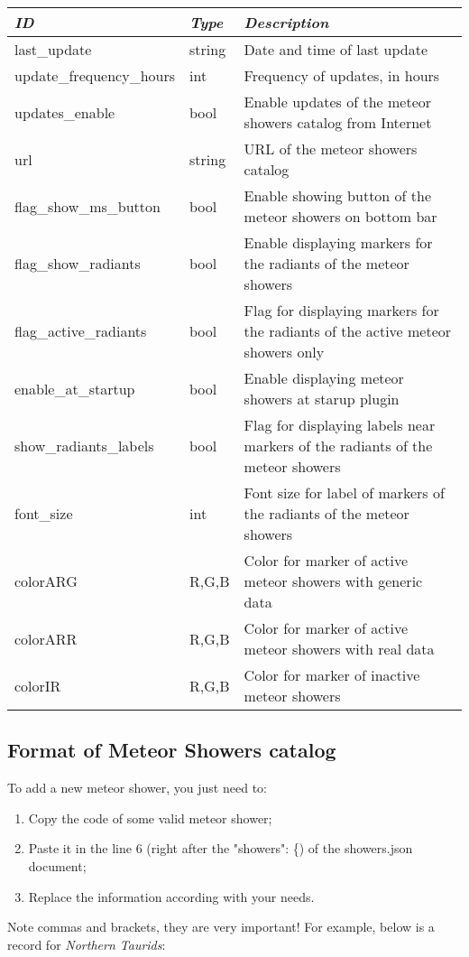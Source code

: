 \begin{longtabu} to \textwidth {l|l|X}\toprule
\emph{ID}            & \emph{Type} & \emph{Description}\\\midrule
last\_update         & string & Date and time of last update \\\midrule
update\_frequency\_hours & int & Frequency of updates, in hours \\\midrule
updates\_enable      & bool & Enable updates of the meteor showers catalog from Internet \\\midrule
url                  & string & URL of the meteor showers catalog \\\midrule
flag\_show\_ms\_button & bool & Enable showing button of the meteor showers on bottom bar \\\midrule
flag\_show\_radiants   & bool & Enable displaying markers for the radiants of the meteor showers \\\midrule
flag\_active\_radiants & bool & Flag for displaying markers for the radiants of the active meteor showers only \\\midrule
enable\_at\_startup    & bool & Enable displaying meteor showers at starup plugin \\\midrule
show\_radiants\_labels & bool & Flag for displaying labels near markers of the radiants of the meteor showers \\\midrule
font\_size             & int  & Font size for label of markers of the radiants of the meteor showers \\\midrule
colorARG               & R,G,B & Color for marker of active meteor showers with generic data \\\midrule
colorARR               & R,G,B & Color for marker of active meteor showers with real data \\\midrule
colorIR               & R,G,B & Color for marker of inactive meteor showers \\\bottomrule
\end{longtabu}

\subsection{Format of Meteor Showers catalog}
\label{sec:plugins:MeteorShowers:format}

To add a new meteor shower, you just need to:
\begin{enumerate}
\item Copy the code of some valid meteor shower;
\item Paste it in the line 6 (right after the "showers": \{) of the showers.json document;
\item Replace the information according with your needs.
\end{enumerate}
Note commas and brackets, they are very important! For example, below is a record for \textit{Northern Taurids}:

